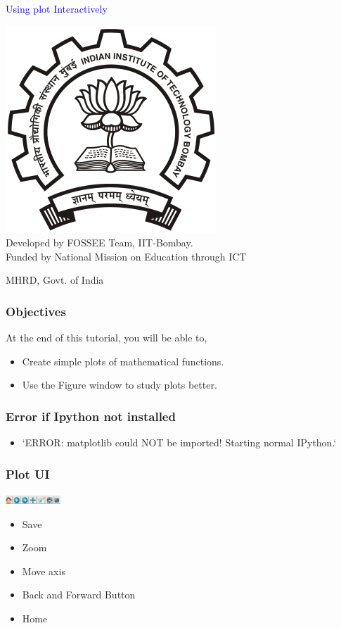 \documentclass[presentation]{beamer}
\title{}
\author{FOSSEE}
\date{}
\begin{document}
\begin{frame}

\begin{center}
\textcolor{blue}{Using plot Interactively}
\end{center}
\begin{center}
\includegraphics[scale=0.25]{../images/iitb-logo.png}\\
Developed by FOSSEE Team, IIT-Bombay. \\ 
Funded by National Mission on Education through ICT

MHRD, Govt. of India
\end{center}
\end{frame}
\begin{frame}
\frametitle{Objectives}
\label{sec-2}

  At the end of this tutorial, you will be able to, 

\begin{itemize}
\item Create simple plots of mathematical functions.
\item Use the Figure window to study plots better.
\end{itemize}
\end{frame}
\begin{frame}
\frametitle{Error if Ipython not installed}
\label{sec-3}
\begin{itemize}

\item `ERROR: matplotlib could NOT be imported!  Starting normal IPython.`\\
\label{sec-3_1}%
\end{itemize} %
\end{frame}
\begin{frame}
\frametitle{Plot UI}
\label{sec-4}

   \includegraphics[height=0.12in, interpolate=true]{buttons}

\begin{itemize}
\item Save
\item Zoom
\item Move axis
\item Back and Forward Button
\item Home
\end{itemize}
\end{frame}
\end{document}
